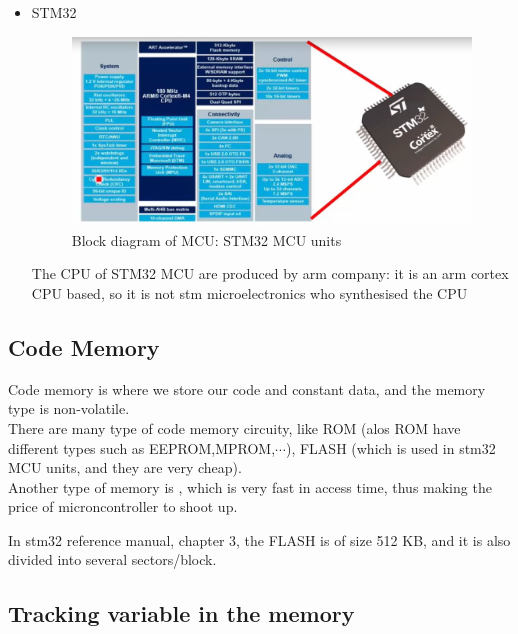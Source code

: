 \begin{itemize}
    \item STM32 
    
\begin{figure}[h]
\centering
\includegraphics[scale=0.5]{Figures/Embedded_C/anatomy_micro_stm32}
\caption{Block diagram of MCU: STM32 MCU units}
\label{fig:Embedded_C:anatomy_micro_stm32}
\end{figure} 
    
The CPU of STM32 MCU are produced by arm company: it is an arm cortex CPU based, so it is not stm microelectronics who synthesised the CPU    
    
\end{itemize}


\subsection{Code Memory}

Code memory is where we store our code and constant data, and the memory type is non-volatile.\\

There are many type of code memory circuity, like ROM (alos ROM have different types such as EEPROM,MPROM,$\cdots$), FLASH (which is used in stm32 MCU units, and they are very cheap).\\

Another type of memory is  , which is very fast in access time, thus making the price of microncontroller to shoot up.

In stm32 reference manual, chapter 3, the FLASH is of size 512 KB, and it is also divided into several sectors/block.


\subsection{Tracking variable in the memory}

